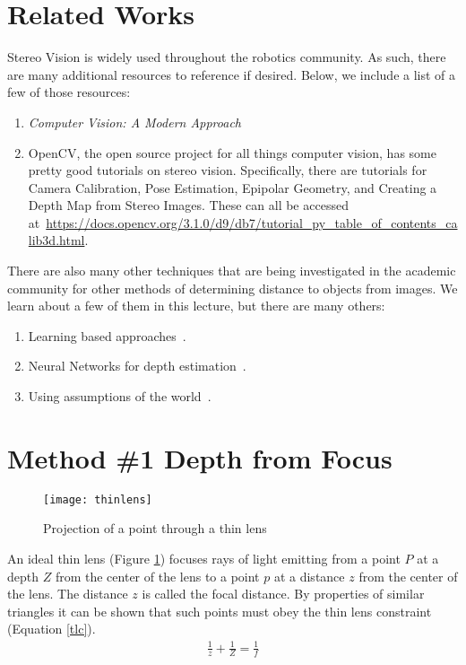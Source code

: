 \documentclass[twoside]{article}
\begin{document}
\section{Related Works}
Stereo Vision is widely used throughout the robotics community. As such, there are many additional resources to reference if desired.
Below, we include a list of a few of those resources:
\begin{enumerate}
	\item \textit{Computer Vision: A Modern Approach}~\cite{FP}
	\item OpenCV, the open source project for all things computer vision, has some pretty good tutorials on stereo vision. 
	Specifically, there are tutorials for Camera Calibration, Pose Estimation, Epipolar Geometry, and Creating a Depth Map from Stereo Images. 
	These can all be accessed at~\url{https://docs.opencv.org/3.1.0/d9/db7/tutorial_py_table_of_contents_calib3d.html}.
\end{enumerate}
There are also many other techniques that are being investigated in the academic community for other methods of determining distance to objects from images. We learn about a few of them in this lecture, but there are many others:
\begin{enumerate}
	\item Learning based approaches~\cite{Saxena_depth_est}.
	\item Neural Networks for depth estimation~\cite{nips_depth,single_image_depth,Schennings1167554}.
	\item Using assumptions of the world~\cite{effecient_exact,inside_box}.
\end{enumerate}

\section{Method \#1 Depth from Focus}

\begin{figure}[h!]
  \begin{center}
    \texttt{[image: thinlens]}
  \end{center}
  \caption{Projection of a point through a thin lens}
  \label{lens}
\end{figure}

An ideal thin lens (Figure \ref{lens}) focuses rays of light emitting from a point $P$ at a depth $Z$ from the center of the lens to a point $p$ at a distance $z$ from the center of the lens. The distance $z$ is called the focal distance. By properties of similar triangles it can be shown that such points must obey the thin lens constraint (Equation \ref{tlc}).
\begin{align}
  \label{tlc}
  \frac{1}{z} + \frac{1}{Z} = \frac{1}{f}
\end{align}
\end{document}
